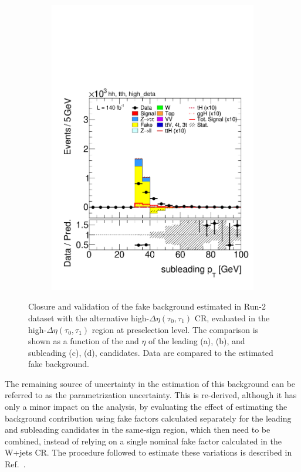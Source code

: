 \begin{figure}[htbp]
\begin{subfigure}[b]{0.45\textwidth}
          \includegraphics[width=\textwidth]{images/highdeta_highdeta_run2/plot_tau_1_pt_hh_tth_15_16_17_18_high_deta.pdf}
          \caption{}
        \end{subfigure}
        \caption{
    Closure and validation of the fake background estimated in Run-2 dataset with the alternative high-$\Delta \eta (\tau_0, \tau_1)$ \tauhadhad CR, evaluated in the high-$\Delta \eta (\tau_0, \tau_1)$ region at preselection level.
    The comparison is shown as a function of the \pt and $\eta$ of the leading (a), (b), and subleading (c), (d), \tauhad candidates. 
    Data are compared to the estimated fake background.
  }
  \label{fig:closure_validation_highdeta_run2}
\end{figure}

The remaining source of uncertainty in the estimation of this background can be referred to as the parametrization uncertainty. This is re-derived, although it has only a minor impact on the analysis, by evaluating the effect of estimating the background contribution using fake factors calculated separately for the leading and subleading \tauhad candidates in the \tauhadhad same-sign region, which then need to be combined, instead of relying on a single nominal fake factor calculated in the \taulephad W+jets CR. The procedure followed to estimate these variations is described in Ref.~\cite{serhat_tesis}.
  




